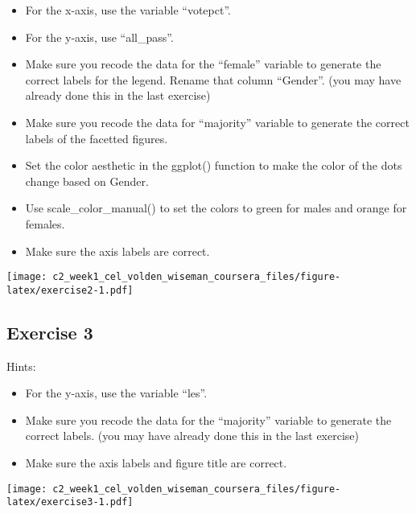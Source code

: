 \documentclass[
]{article}
\begin{document}
\begin{itemize}
\item
  For the x-axis, use the variable ``votepct''.
\item
  For the y-axis, use ``all\_pass''.
\item
  Make sure you recode the data for the ``female'' variable to generate
  the correct labels for the legend. Rename that column ``Gender''. (you
  may have already done this in the last exercise)
\item
  Make sure you recode the data for ``majority'' variable to generate
  the correct labels of the facetted figures.
\item
  Set the color aesthetic in the ggplot() function to make the color of
  the dots change based on Gender.
\item
  Use scale\_color\_manual() to set the colors to green for males and
  orange for females.
\item
  Make sure the axis labels are correct.
\end{itemize}

\texttt{[image: c2\_week1\_cel\_volden\_wiseman\_coursera\_files/figure-latex/exercise2-1.pdf]}

\hypertarget{exercise-3}{%
\subsection{Exercise 3}\label{exercise-3}}

Hints:

\begin{itemize}
\item
  For the y-axis, use the variable ``les''.
\item
  Make sure you recode the data for the ``majority'' variable to
  generate the correct labels. (you may have already done this in the
  last exercise)
\item
  Make sure the axis labels and figure title are correct.
\end{itemize}

\texttt{[image: c2\_week1\_cel\_volden\_wiseman\_coursera\_files/figure-latex/exercise3-1.pdf]}
\end{document}
